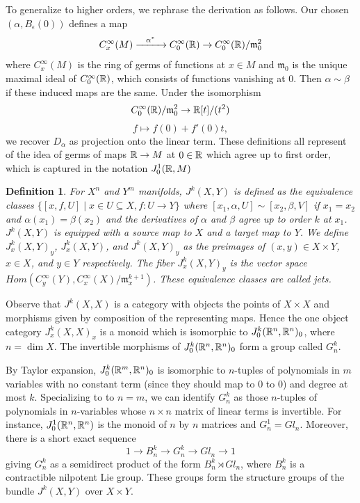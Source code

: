 \documentclass{article}
\newtheorem{definition}[theorem]{Definition}
\newtheorem{proposed work}[theorem]{Proposed Work}
\begin{document}
To generalize to higher orders, we rephrase the derivation as follows. Our chosen $(\alpha, B_{\epsilon}(0))$ defines a map
\[
  {C^\infty_{  x  }(M)} \xrightarrow{\,\,\,\,\,\,\alpha^*\,\,\,\,\,\,} C^\infty_0(\mathbb R) \to C^\infty_0(\mathbb R)/  {\mathfrak{m}_0^2}
\]
where $C^\infty_x(M)$ is the ring of germs of functions at $x \in M$ and $\mathfrak{m}_0$ is the unique maximal ideal of $C^\infty_0(\mathbb R)$, which consists of functions vanishing at 0. Then $\alpha\sim\beta$ if these induced maps are the same. Under the isomorphism
\[C_0^\infty(\mathbb R)/\mathfrak{m}_0^2\to \mathbb R[t]/(t^2)\]
\[f\mapsto f(0)+f'(0)t,\]
we recover $D_\alpha$ as projection onto the linear term. These definitions all represent of the idea of germs of maps $\mathbb R \to M$ at $0\in\mathbb R$ which agree up to first order, which is captured in the notation $J^1_0(\mathbb R, M)$


\begin{definition}
For $X^n$ and $Y^m$ manifolds, $J^k(X,Y)$ is defined as the equivalence classes $\{[x,f, U] \mid x\in U\subseteq X, f:U\to Y\}$ 
where $[x_1, \alpha, U]\sim [x_2, \beta, V]$ if $x_1=x_2$ and $\alpha(x_1)=\beta(x_2)$ and the derivatives of $\alpha$ and $\beta$ agree up to order $k$ at $x_1$.
$J^k(X,Y)$ is equipped with a source map to $X$ and a target map to $Y$.
We define $J^k_x(X,Y)_y$, $J^k_x(X,Y)$, and $J^k(X,Y)_y$ as the preimages of $(x,y)\in X\times Y$, $x\in X$, and $y\in Y$ respectively.
The fiber $J^k_x(X,Y)_y$ is the vector space $Hom(C^\infty_y(Y), C^\infty_x(X)/\mathfrak{m}_x^{k+1})$.
These equivalence classes are called jets.
\end{definition}

Observe that $J^k(X,X)$ is a category with objects the points of $X\times X$ and morphisms given by composition of the representing maps.  Hence the one object category $J^k_x(X,X)_x$ is a monoid which is isomorphic to $J^k_0(\mathbb R^n,\mathbb R^n)_0$, where $n=\dim X$. The invertible morphisms of $J^k_0(\mathbb R^n, \mathbb R^n)_0$ form a group called $G^k_n$.

By Taylor expansion, $J^k_0(\mathbb R^m, \mathbb R^n)_0$ is isomorphic to $n$-tuples of polynomials in $m$ variables with no constant term (since they should map to 0 to 0) and degree at most $k$. Specializing to to $n=m$, we can identify $G^k_n$ as those $n$-tuples of polynomials in $n$-variables whose $n\times n$ matrix of linear terms is invertible. For instance, $J^1_0(\mathbb R^n,\mathbb R^n)$ is the monoid of $n$ by $n$ matrices and $G^1_n=Gl_n$. Moreover, there is a short exact sequence
\[
  1\to B_n^k\to G^k_n\to Gl_n\to 1
\]
giving $G^k_n$ as a semidirect product of the form $B_n^k \rtimes Gl_n$,  where $B_n^k$ is a contractible nilpotent Lie group. These groups form the structure groups of the bundle $J^k(X,Y)$ over $X\times Y$.
\end{document}
